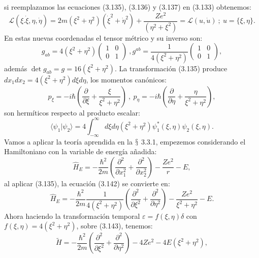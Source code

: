 si reemplazamos las ecuaciones (3.135), (3.136) y (3.137) en (3.133) obtenemos:
\begin{equation}
\mathcal{L}(\xi.\dot{\xi},\eta,\dot{\eta})=2m(\xi^{2}+\eta^{2})(\dot{\xi}^{2}+\dot{\eta}^{2})+\frac{Ze^{2}}{(\eta^{2}+\xi^{2})}=\mathcal{L}(u,\dot{u})\ ;\ u=\{\xi,\eta\}.
\end{equation}
En estas nuevas coordenadas el tensor métrico y su inverso son:
\begin{equation}
g_{ab}=4(\xi^{2}+\eta^{2})\left(\begin{array}{cc}
1 & 0\\
0 & 1
\end{array}\right)\ ,g^{ab}=\frac{1}{4(\xi^{2}+\eta^{2})}\left(\begin{array}{cc}
1 & 0\\
0 & 1
\end{array}\right) ,
\end{equation}
además $\det g_{ab}=g=16(\xi^2+\eta^2)$. La transformación (3.135) produce $dx_{1}dx_{2}=4(\xi^{2}+\eta^{2})d\xi d\eta$, los momentos canónicos:
\begin{equation}
p_{\xi}=-i\hbar\left(\frac{\partial}{\partial\xi}+\frac{\xi}{\xi^{2}+\eta^{2}}\right)\ ,\ p_{\eta}=-i\hbar\left(\frac{\partial}{\partial\eta}+\frac{\eta}{\xi^{2}+\eta^{2}}\right),
\end{equation}
son hermíticos respecto al producto escalar:
\begin{equation}
\langle\psi_{1}|\psi_{2}\rangle=4\int_{-\infty}^{\infty}d\xi d\eta(\xi^{2}+\eta^{2})\psi_{1}^{*}(\xi,\eta)\psi_{2}(\xi,\eta) .
\end{equation}
Vamos a aplicar la teoría aprendida en la $\mathsection$ 3.3.1, empezemos considerando el Hamiltoniano con la variable de energía añadida:
\begin{equation}
\hat{H}_{E}=-\frac{\hbar^{2}}{2m}\left(\frac{\partial^{2}}{\partial x_{1}^{2}}+\frac{\partial^{2}}{\partial x_{2}^{2}}\right)-\frac{Ze^{2}}{r}-E,
\end{equation}
al aplicar (3.135), la ecuación (3.142) se convierte en:
\begin{equation}
\hat{H}_{E}=-\frac{\hbar^{2}}{2m}\frac{1}{4(\xi^{2}+\eta^{2})}\left(\frac{\partial^{2}}{\partial\xi^{2}}+\frac{\partial^{2}}{\partial\eta^{2}}\right)-\frac{Ze^{2}}{\xi^{2}+\eta^{2}}-E.
\end{equation}
Ahora haciendo la transformación temporal $\varepsilon =f(\xi ,\eta)\delta $ con $f(\xi ,\eta)= 4(\xi^2+\eta^2)$, sobre (3.143), tenemos:
\begin{equation}
\tilde{H}=-\frac{\hbar^{2}}{2m}\left(\frac{\partial^{2}}{\partial\xi^{2}}+\frac{\partial^{2}}{\partial\eta^{2}}\right)-4Ze^{2}-4E(\xi^{2}+\eta^{2}),
\end{equation}
